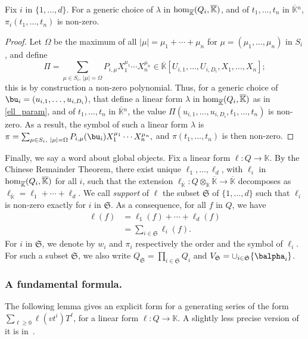\documentclass[12pt]{article}
\def\K {\ensuremath{\mathbb{K}}}
\def\Kbar {{\ensuremath{\overline{\mathbb{K}}}}}
\def\K{\mathbb{K}}
\begin{document}
\begin{lemma}\label{lemma:symbol0}
	Fix $i$ in $\{1,\dots,d\}$. For a generic choice of $\lambda$ in ${\rm
		hom}_\Kbar(Q_i,\Kbar)$, and of $t_1,\dots,t_n$ in $\Kbar{}^n$,
	$\pi_i(t_1,\dots,t_n)$ is non-zero.
\end{lemma}
\begin{proof}
	Let $\Omega$ be the maximum of all $|\mu|=\mu_1+\cdots+\mu_n$ for
	$\mu=(\mu_1,\dots,\mu_n)$ in $S_i$, and define 
	$$\Pi =\sum_{\mu \in S_i,\ |\mu|=\Omega}P_{i,\mu} X_1^{\mu_1} \cdots
	X_n^{\mu_n} \in \Kbar[U_{i,1},\dots,U_{i,D_i},X_1,\dots,X_n];$$ this
	is by construction a non-zero polynomial.  Thus, for a generic
	choice of $\bu_i=(u_{i,1},\dots,u_{i,D_i})$, that define a linear form
	$\lambda$ in ${\rm hom}_\Kbar(Q_i,\Kbar)$ as in \cref{ell_param},
	and of $t_1,\dots,t_n$ in $\Kbar{}^n$, the value
	$\Pi(u_{i,1},\dots,u_{i,D_i},t_1,\dots,t_n)$ is non-zero. As a
	result, the symbol of such a linear form $\lambda$ is $\pi =\sum_{\mu \in
		S_i,\ |\mu|=\Omega}P_{i,\mu}(\bu_i) X_1^{\mu_1} \cdots X_n^{\mu_n},$
	and $\pi(t_1,\dots,t_n)$ is then non-zero.
\end{proof}



Finally, we say a word about global objects.  Fix a linear form $\ell:
Q \to \K$. By the Chinese Remainder Theorem, there exist unique
$\ell_1,\dots,\ell_d$, with $\ell_i$ in ${\rm hom}_\Kbar(Q_i,\Kbar)$
for all $i$, such that the extension $\ell_\Kbar: Q\otimes_\K \Kbar
\to \Kbar$ decomposes as $\ell_\Kbar = \ell_1 + \cdots + \ell_d$. We
call {\em support} of $\ell$ the subset $\mathfrak{S}$ of
$\{1,\dots,d\}$ such that $\ell_i$ is non-zero exactly for $i$ in
$\mathfrak{S}$.  As a consequence, for all $f$ in $Q$, we have
\begin{align}\label{eq:fui}
\ell(f) &= \ell_1(f) + \cdots + \ell_d(f)\nonumber\\
&=  \sum_{i \in \mathfrak{S}} \ell_i(f).
\end{align}
For $i$ in $\mathfrak{S}$, we denote by $w_i$ and $\pi_i$ respectively
the order and the symbol of $\ell_i$. For such a subset
$\mathfrak{S}$, we also write $Q_\mathfrak{S}=\prod_{i \in
	\mathfrak{S}} Q_i$ and $V_\mathfrak{S}=\cup_{i \in \mathfrak{S}}
\{\balpha_i\}$.


\subsubsection{A fundamental formula.}  The following lemma 
gives an explicit form for a generating series of the form $\sum_{\ell
	\ge 0} \ell(v t^i)T^\ell$, for a linear form $\ell:Q \to \K$. A
slightly less precise version of it is in~\cite{BoSaSc03}.
\end{document}

